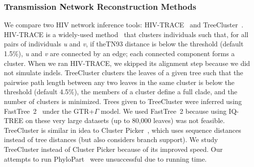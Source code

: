 \subsubsection{Transmission Network Reconstruction Methods}
We compare two \gls{HIV} network inference tools: HIV-TRACE~\cite{Pond2018} and TreeCluster~\cite{Balaban2019}. HIV-TRACE is a widely-used method~\cite{Rose2017,Wertheim2017,Perez-Losada2017} that clusters individuals such that, for all pairs of individuals \textit{u} and \textit{v}, if the\gls{TN93} distance is below the threshold (default 1.5\%), \textit{u} and \textit{v} are connected by an edge; each connected component  forms a cluster. When we ran HIV-TRACE, we skipped its alignment step because we did not simulate indels. TreeCluster clusters the leaves of a given tree such that the pairwise path length between any two leaves in the same cluster is below the threshold (default 4.5\%), the members of a cluster define a full clade, and the number of clusters is minimized. Trees given to TreeCluster were inferred using FastTree~2~\cite{Price2010} under the \gls{GTR}+$\Gamma$ model. We used FastTree~2 because using IQ-TREE on these very large datasets (up to 80,000 leaves) was not feasible. TreeCluster is similar in idea to Cluster Picker~\cite{Ragonnet-Cronin2013}, which uses sequence distances instead of tree distances (but also considers branch support). We study TreeCluster instead of Cluster Picker because of its improved speed.  Our attempts to run PhyloPart~\cite{Prosperi2011} were unsuccessful due to running time.

